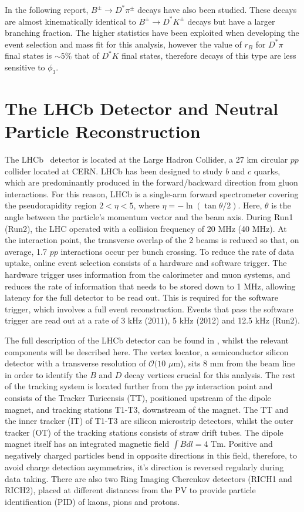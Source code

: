 \documentclass[oneside,12pt]{article}
\begin{document}
In the following report, $B^{\pm}\rightarrow D^{*}\pi^{\pm}$ decays have also
been studied. These decays are almost kinematically identical to
$B^{\pm}\rightarrow D^{*}K^{\pm}$ decays but have a larger branching fraction.
The higher statistics have been exploited when developing the event selection
and mass fit for this analysis, however the value of $r_B$ for $D^*\pi$ final
states is $\sim 5\%$ that of $D^*K$ final states, therefore decays of this
type are less sensitive to $\phi_3$.

\section{The LHCb Detector and Neutral Particle Reconstruction} \label{detector}
The LHCb~\cite{LHCbDetector} detector is located at the Large Hadron Collider, a
27 km circular $pp$ collider located at CERN. LHCb has been designed to study
$b$ and $c$ quarks, which are predominantly produced in the forward/backward
direction from gluon interactions. For this reason, LHCb is a single-arm forward
spectrometer covering the pseudorapidity region $2 < \eta < 5$, where $\eta =
-\ln (\tan \theta / 2)$. Here, $\theta$ is the angle between the particle's
momentum vector and the beam axis. During Run1 (Run2), the LHC operated with a
collision frequency of 20 MHz (40 MHz). At the interaction point, the transverse
overlap of the 2 beams is reduced so that, on average, 1.7 $pp$ interactions
occur per bunch crossing. To reduce the rate of data uptake, online event
selection consists of a hardware and software trigger. The hardware trigger uses
information from the calorimeter and muon systems, and reduces the rate of
information that needs to be stored down to 1 MHz, allowing latency for the full
detector to be read out. This is required for the software trigger, which
involves a full event reconstruction. Events that pass the software trigger are
read out at a rate of 3 kHz (2011), 5 kHz (2012) and 12.5 kHz (Run2).

The full description of the LHCb detector can be found in \cite{LHCbDetector},
whilst the relevant components will be described here.  The vertex locator, a
semiconductor silicon detector with a transverse resolution of $\mathcal{O}(10$
$\mu$m), sits $8$ mm from the beam line in order to identify the $B$ and $D$
decay vertices crucial for this analysis. The rest of the tracking system is
located further from the $pp$ interaction point and consists of the Tracker
Turicensis (TT), positioned upstream of the dipole magnet, and tracking stations
T1-T3, downstream of the magnet. The TT and the inner tracker (IT) of T1-T3 are
silicon microstrip detectors, whilst the outer tracker (OT) of the tracking
stations consists of straw drift tubes. The dipole magnet itself has an
integrated magnetic field $\int B dl = 4$ Tm.  Positive and negatively charged
particles bend in opposite directions in this field, therefore, to avoid charge
detection asymmetries, it's direction is reversed regularly during data taking.
There are also two Ring Imaging Cherenkov detectors (RICH1 and RICH2), placed at
different distances from the PV to provide particle identification (PID) of
kaons, pions and protons.
\end{document}

